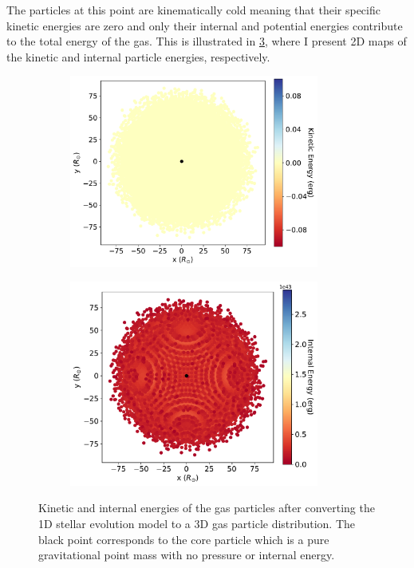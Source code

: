 The particles at this point are kinematically cold meaning that their specific kinetic energies are zero and only their internal and potential energies contribute to the total energy of the gas. This is illustrated in \cref{fig:kinetic_internal_energies}, where I present 2D maps of the kinetic and internal particle energies, respectively.
\begin{figure}[H]
    \centering
    \begin{subfigure}{.5\textwidth}
    \centering
    \includegraphics[width=0.9\textwidth]{Thesis/graphs/tertiary_kin_energy_before_relaxation.pdf}
    \label{fig:mass_loss}
    \end{subfigure}%
    \begin{subfigure}{.5\textwidth}
    \centering
    \includegraphics[width=0.9\textwidth]{Thesis/graphs/tertiary_internal_energy_before_relaxation.pdf}
    \label{fig:radius_profile}
    \end{subfigure}
    \caption{ Kinetic and internal energies of the gas particles after converting the 1D stellar evolution model to a 3D gas particle distribution. The black point corresponds to the core particle which is a pure gravitational point mass with no pressure or internal energy.}
    \label{fig:kinetic_internal_energies}
\end{figure}
